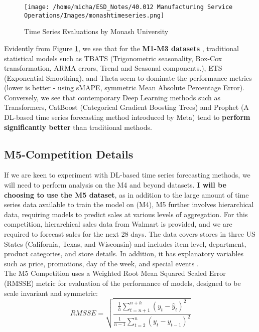 \documentclass[12pt]{article}
\begin{document}
\begin{figure}[H]
    \centering
    \texttt{[image: /home/micha/ESD\_Notes/40.012 Manufacturing Service Operations/Images/monashtimeseries.png]}
    \caption{Time Series Evaluations by Monash University}
    \label{fig:6-monash}
\end{figure} 

\noindent Evidently from Figure \ref{fig:6-monash}, we see that for the \textbf{M1-M3 datasets} \cite{godahewa2021monash}, traditional statistical models such as TBATS (Trigonometric seasonality, Box-Cox transformation, ARMA errors, Trend and Seasonal components.), ETS (Exponential Smoothing), and Theta seem to dominate the performance metrics (lower is better - using sMAPE, symmetric Mean Absolute Percentage Error). Conversely, we see that contemporary Deep Learning methods such as Transformers, CatBoost (Categorical Gradient Boosting Trees) and Prophet (A DL-based time series forecasting method introduced by Meta) tend to \textbf{perform significantly better} than traditional methods.

\subsection*{M5-Competition Details}

If we are keen to experiment with DL-based time series forecasting methods, we will need to perform analysis on the M4 and beyond datasets. \textbf{I will be choosing to use the M5 dataset}, as in addition to the large amount of time series data available to train the model on (M4), M5 further involves hierarchical data, requiring models to predict sales at various levels of aggregation. For this competition, hierarchical sales data from Walmart is provided, and we are required to forecast sales for the next 28 days. The data covers stores in three US States (California, Texas, and Wisconsin) and includes item level, department, product categories, and store details. In addition, it has explanatory variables such as price, promotions, day of the week, and special events \cite{m5-forecasting-accuracy}. \\ 

\noindent The M5 Competition uses a Weighted Root Mean Squared Scaled Error (RMSSE) metric for evaluation of the performance of models, designed to be scale invariant and symmetric: \begin{equation}
    RMSSE = \sqrt{ \frac{\frac{1}{h} \sum_{t=n+1}^{n+h} (y_{t}-\hat{y}_t)^{2}}{\frac{1}{n-1} \sum_{t=2}^{n}(y_{t}-y_{t-1})^{2}}}
\end{equation}
\end{document}
